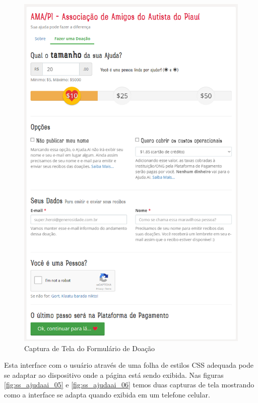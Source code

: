 \begin{figure}[H]
	\caption{\label{fig:ss_ajudaai_04}Captura de Tela do Formulário de Doação}
    \centering
    \includegraphics[scale=0.6]{imagens/screenshot-ajudaai-04.png}
\end{figure}

Esta interface com o usuário através de uma folha de estilos CSS adequada pode se adaptar ao dispositivo onde a página está sendo exibida. Nas figuras \ref{fig:ss_ajudaai_05} e \ref{fig:ss_ajudaai_06} temos duas capturas de tela mostrando como a interface se adapta quando exibida em um telefone celular.

